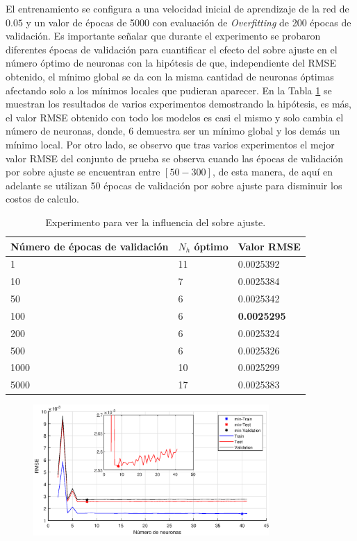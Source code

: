 \documentclass[12pt]{article}
\begin{document}
\begin{itemize}
	El entrenamiento se configura a una velocidad inicial de aprendizaje de la red de $0.05$ y un valor de épocas de 5000 con evaluación de \textit{Overfitting} de 200 épocas de validación. Es importante señalar que durante el experimento se probaron diferentes épocas de validación para cuantificar el efecto del sobre ajuste en el número óptimo de neuronas con la hipótesis de que, independiente del RMSE obtenido, el mínimo global se da con la misma cantidad de neuronas óptimas afectando solo a los mínimos locales que pudieran aparecer. En la Tabla \ref{sobreajuste} se muestran los resultados de varios experimentos demostrando la hipótesis, es más, el valor RMSE obtenido con todo los modelos es casi el mismo y solo cambia el número de neuronas, donde, $6$ demuestra ser un mínimo global y los demás un mínimo local. Por otro lado, se observo que tras varios experimentos el mejor valor RMSE del conjunto de prueba se observa cuando las épocas de validación por sobre ajuste se encuentran entre $[50-300]$, de esta manera, de aquí en adelante se utilizan 50 épocas de validación por sobre ajuste para disminuir los costos de calculo.
	\begin{table}[h!]
		\centering
		\caption{Experimento para ver la influencia del sobre ajuste.}
		\begin{tabular}{|l|l|l|}
			\hline
			Número de épocas de validación & $N_h$ óptimo & Valor RMSE \\ \hline
			1                              & 11           & 0.0025392   \\ \hline
			10                             & 7            & 0.0025384  \\ \hline
			50                             & 6            & 0.0025342  \\ \hline
			100                            & 6            & \textbf{0.0025295}  \\ \hline
			200                            & 6            & 0.0025324  \\ \hline
			500                            & 6            & 0.0025326  \\ \hline
			1000                            & 10           & 0.0025299  \\ \hline
			5000                            & 17            & 0.0025383  \\ \hline
		\end{tabular}
	\label{sobreajuste}
	\end{table}
	\newpage
	\begin{figure}[t!]
		\centering
		 \includegraphics[width=0.8\textwidth]{imag/redes/RMSE_full.eps}

\end{figure}
\end{itemize}
\end{document}
